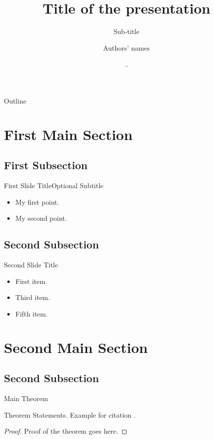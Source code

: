 \documentclass[xcolor=dvipsnames]{beamer}
\title{Title of the presentation}
\subtitle{Sub-title}
\author{Authors' names}
\institute[National University of Singapore] %
{
  Department of Computer Science\\
  National University of Singapore
}
\date{\tiny \the\year.\the\month.\the\day}
\begin{document}
\begin{frame}
  \titlepage
\end{frame}

\begin{frame}{Outline}
  \tableofcontents
\end{frame}

\section{First Main Section}

\subsection{First Subsection}
\begin{frame}{First Slide Title}{Optional Subtitle}
  \begin{itemize}
  \item {
    My first point.
  }
  \item {
    My second point.
  }
  \end{itemize}
\end{frame}

\subsection{Second Subsection}
\begin{frame}{Second Slide Title}
  \begin{itemize}
  \item {
    First item.
    \pause %
  }
  \item<3-> {
    Third item.
  }
  \item<5-> {
    Fifth item. 
  }
  \end{itemize}
\end{frame}

\section{Second Main Section}

\subsection{Second Subsection}
\begin{frame}{Main Theorem}
\begin{theorem}
Theorem Statements. Example for citation \cite{Author1990}.
\end{theorem}

\begin{proof}
Proof of the theorem goes here.
\end{proof}
\end{frame}
\end{document}
